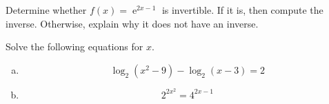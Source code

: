 \documentclass[12pt]{amsart}
\begin{document}
\newpage

\begin{thm}[5 Points]\label{ex4}
  Determine whether $f(x) = \operatorname{e}^{2x - 1}$ is invertible.
  If it is, then compute the inverse.  
  Otherwise, explain why it does not have an inverse.
\end{thm}

\newpage

\begin{thm}[15 Points]\label{ex5}
  Solve the following equations for $x$.
  \begin{enumerate}[(a)]
  \item
    $$\log_2(x^2 - 9) - \log_2(x - 3) = 2$$
    \vspace{3.5in}
  \item
    $$2^{2x^2} = 4^{2x - 1}$$
  \end{enumerate}
\end{thm}
\end{document}
